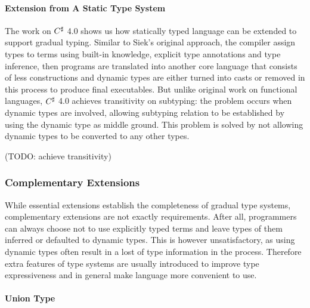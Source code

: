 \paragraph{Extension from A Static Type System}

The work on $C^\sharp$ 4.0 shows us how statically typed language can be extended
to support gradual typing.
Similar to Siek's original approach, the compiler assign types to terms using built-in knowledge,
explicit type annotations and type inference, then programs are translated into another core
language that consists of less constructions and dynamic types are either turned into
casts or removed in this process to produce final executables.
But unlike original work on functional languages, $C^\sharp$ 4.0 achieves transitivity on subtyping:
the problem occurs when dynamic types are involved, allowing subtyping relation to be established
by using the dynamic type as middle ground. This problem is solved by not allowing dynamic types
to be converted to any other types.



(TODO: achieve transitivity)

\subsubsection{Complementary Extensions}

While essential extensions establish the completeness of gradual type systems,
complementary extensions are not exactly requirements.
After all, programmers can always choose not to use explicitly typed terms and 
leave types of them inferred or defaulted to dynamic types.
This is however unsatisfactory, as using dynamic types often result in a lost of type information in the process.
Therefore extra features of type systems are usually introduced to improve type expressiveness and 
in general make language more convenient to use.

\paragraph{Union Type}

